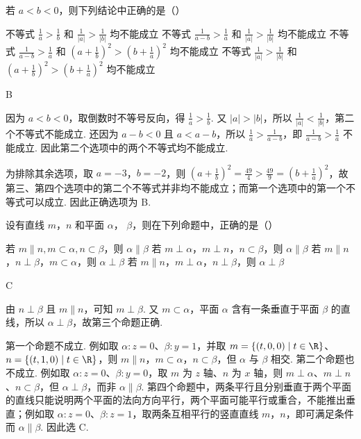 \documentclass[UTF8,a4paper,oneside,11pt]{ctexbook}
\begin{document}
\begin{problem}
若 \(a < b < 0\)，则下列结论中正确的是（\quad）

\choices
    {不等式 \(\frac{1}
    {a} > \frac{1}
    {b}\) 和 \(\frac{1}
    {|a|} > \frac{1}{|b|}\) 均不能成立}
 {不等式 \(\frac{1}{a - b} > \frac{1}{a}\) 和 \(\frac{1}{|a|} > \frac{1}{|b|}\) 均不能成立}
 {不等式 \(\frac{1}{a - b} > \frac{1}{a}\) 和 \((a + \frac{1}{b})^2 > (b + \frac{1}{a})^2\) 均不能成立}
 {不等式 \(\frac{1}{|a|} > \frac{1}{|b|}\) 和 \((a + \frac{1}{b})^2 > (b + \frac{1}{a})^2\) 均不能成立}
\end{problem}

\begin{answer}
B
\end{answer}

\begin{solution}
因为 \(a<b<0\)，取倒数时不等号反向，得 \(\frac1a>\frac1b\). 又 \(|a|>|b|\)，所以 \(\frac1{|a|}<\frac1{|b|}\)，第二个不等式不能成立. 还因为 \(a-b<0\) 且 \(a<a-b\)，所以 \(\frac1a>\frac1{a-b}\)，即 \(\frac1{a-b}>\frac1a\) 不能成立. 因此第二个选项中的两个不等式均不能成立.

为排除其余选项，取 \(a=-3\)，\(b=-2\)，则 \(\left(a+\frac1b\right)^2=\frac{49}{4}>\frac{49}{9}=\left(b+\frac1a\right)^2\)，故第三、第四个选项中的第二个不等式并非均不能成立；而第一个选项中的第一个不等式可以成立. 因此正确选项为 B.
\end{solution}

\begin{problem}
设有直线 \(m\)，\(n\) 和平面 \(\alpha \)， \(\beta\)，则在下列命题中，正确的是（\quad）

\choices
    {若 \(m \parallel n, m \subset \alpha, n \subset \beta\)，则 \(\alpha \parallel \beta\)}
    {若 \(m \perp \alpha\)，\(m \perp n\)，\(n \subset \beta\)，则 \(\alpha \parallel \beta\)}
    {若 \(m \parallel n\)，\(n \perp \beta\)，\(m \subset \alpha\)，则 \(\alpha \perp \beta\)}
    {若 \(m \parallel n\)，\(m \perp \alpha\)，\(n \perp \beta\)，则 \(\alpha \perp \beta\)}
\end{problem}

\begin{answer}
C
\end{answer}

\begin{solution}
由 \(n\perp\beta\) 且 \(m\parallel n\)，可知 \(m\perp\beta\). 又 \(m\subset\alpha\)，平面 \(\alpha\) 含有一条垂直于平面 \(\beta\) 的直线，所以 \(\alpha\perp\beta\)，故第三个命题正确.

第一个命题不成立. 例如取 \(\alpha:z=0\)、\(\beta:y=1\)，并取 \(m=\{(t,0,0)\mid t\in\R\}\)、\(n=\{(t,1,0)\mid t\in\R\}\)，则 \(m\parallel n\)，\(m\subset\alpha\)，\(n\subset\beta\)，但 \(\alpha\) 与 \(\beta\) 相交. 第二个命题也不成立. 例如取 \(\alpha:z=0\)、\(\beta:y=0\)，取 \(m\) 为 \(z\) 轴、\(n\) 为 \(x\) 轴，则 \(m\perp\alpha\)、\(m\perp n\)、\(n\subset\beta\)，但 \(\alpha\perp\beta\)，而非 \(\alpha\parallel\beta\). 第四个命题中，两条平行且分别垂直于两个平面的直线只能说明两个平面的法向方向平行，两个平面可能平行或重合，不能推出垂直；例如取 \(\alpha:z=0\)、\(\beta:z=1\)，取两条互相平行的竖直直线 \(m\)，\(n\)，即可满足条件而 \(\alpha\parallel\beta\). 因此选 C.
\end{solution}
\end{document}
